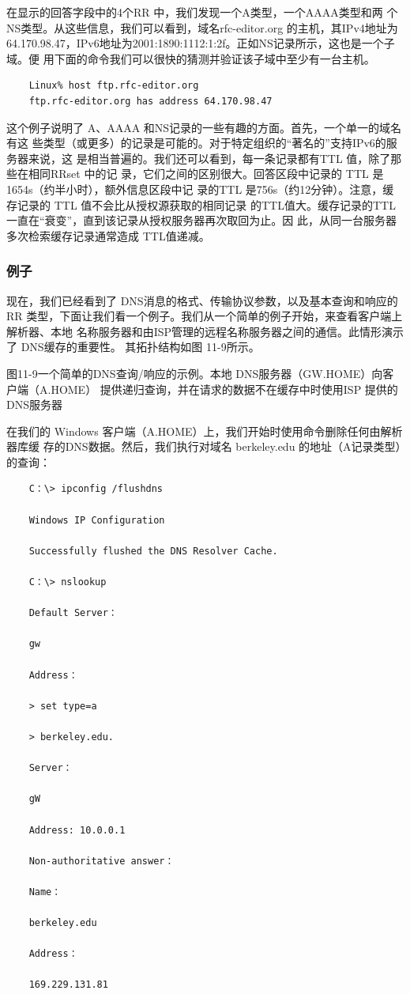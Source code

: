 在显示的回答字段中的4个RR 中，我们发现一个A类型，一个AAAA类型和两
个NS类型。从这些信息，我们可以看到，域名rfc-editor.org 的主机，其IPv4地址为
64.170.98.47，IPv6地址为2001:1890:1112:1:2f。正如NS记录所示，这也是一个子域。便
用下面的命令我们可以很快的猜测并验证该子域中至少有一台主机。

\begin{verbatim}
    Linux% host ftp.rfc-editor.org
    ftp.rfc-editor.org has address 64.170.98.47
\end{verbatim}

这个例子说明了 A、AAAA 和NS记录的一些有趣的方面。首先，一个单一的域名有这
些类型（或更多）的记录是可能的。对于特定组织的“著名的”支持IPv6的服务器来说，这
是相当普遍的。我们还可以看到，每一条记录都有TTL 值，除了那些在相同RRset 中的记
录，它们之间的区别很大。回答区段中记录的 TTL 是1654s（约半小时），额外信息区段中记
录的TTL 是756s（约12分钟）。注意，缓存记录的 TTL 值不会比从授权源获取的相同记录
的TTL值大。缓存记录的TTL 一直在“衰变”，直到该记录从授权服务器再次取回为止。因
此，从同一台服务器多次检索缓存记录通常造成 TTL值递减。

\subsubsection{例子}

现在，我们已经看到了 DNS消息的格式、传输协议参数，以及基本查询和响应的RR
类型，下面让我们看一个例子。我们从一个简单的例子开始，来查看客户端上解析器、本地
名称服务器和由ISP管理的远程名称服务器之间的通信。此情形演示了 DNS缓存的重要性。
其拓扑结构如图 11-9所示。

图11-9一个简单的DNS查询/响应的示例。本地 DNS服务器（GW.HOME）向客户端（A.HOME）
提供递归查询，并在请求的数据不在缓存中时使用ISP 提供的 DNS服务器

在我们的 Windows 客户端（A.HOME）上，我们开始时使用命令删除任何由解析器库缓
存的DNS数据。然后，我们执行对域名 berkeley.edu 的地址（A记录类型）的查询：

\begin{verbatim}
    C：\> ipconfig /flushdns
    
    Windows IP Configuration
    
    Successfully flushed the DNS Resolver Cache.
    
    C：\> nslookup
    
    Default Server：
    
    gw
    
    Address：
    
    > set type=a
    
    > berkeley.edu.
    
    Server：
    
    gW
    
    Address: 10.0.0.1
    
    Non-authoritative answer：
    
    Name：
    
    berkeley.edu
    
    Address：
    
    169.229.131.81
\end{verbatim}

